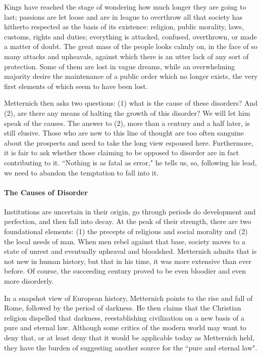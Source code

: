 \begin{quotex}
Kings have reached the stage of wondering how much longer they are going to last; passions are let loose and are in league to overthrow all that society has hitherto respected as the basis of its existence: religion, public morality, laws, customs, rights and duties; everything is attacked, confused, overthrown, or made a matter of doubt. The great mass of the people looks calmly on, in the face of so many attacks and upheavals, against which there is an utter lack of any sort of protection. Some of them are lost in vague dreams, while an overwhelming majority desire the maintenance of a public order which no longer exists, the very first elements of which seem to have been lost. 

\end{quotex}
Metternich then asks two questions: (1) what is the cause of these disorders? And (2), are there any means of halting the growth of this disorder? We will let him speak of the causes. The answer to (2), more than a century and a half later, is still elusive. Those who are new to this line of thought are too often sanguine about the prospects and need to take the long view espoused here. Furthermore, it is fair to ask whether those claiming to be opposed to disorder are in fact contributing to it. ``Nothing is as fatal as error," he tells us, so, following his lead, we need to abandon the temptation to fall into it.

\paragraph{The Causes of Disorder}
Institutions are uncertain in their origin, go through periods do development and perfection, and then fall into decay. At the peak of their strength, there are two foundational elements: (1) the precepts of religious and social morality and (2) the local needs of man. When men rebel against that base, society moves to a state of unrest and eventually upheaval and bloodshed. Metternich admits that is not new in human history, but that in his time, it was more extensive than ever before. Of course, the succeeding century proved to be even bloodier and even more disorderly.

In a snapshot view of European history, Metternich points to the rise and fall of Rome, followed by the period of darkness. He then claims that the Christian religion dispelled that darkness, reestablishing civilization on a new basis of a pure and eternal law. Although some critics of the modern world may want to deny that, or at least deny that it would be applicable today as Metternich held, they have the burden of suggesting another source for the ``pure and eternal law".

